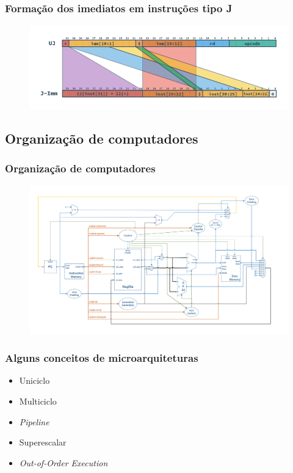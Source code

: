\documentclass[aspectratio=169]{beamer}
\begin{document}
    \begin{frame}
        \frametitle{Formação dos imediatos em instruções tipo \textbf{J}}
        \vfill
        \begin{figure}[H]
        \centering
            \includegraphics[width=.9\textwidth,height=.9\textheight,keepaspectratio]{../images/RV_J_Imm.png}
        \end{figure}
        \vfill
    \end{frame}

    \subsection{Organização de computadores}
    \begin{frame}
        \frametitle{Organização de computadores}
        \vfill
        \begin{figure}[H]
        \centering
            \includegraphics[width=.9\textwidth,height=.9\textheight,keepaspectratio]{../images/singlecycle_generic.png}
        \end{figure}
        \vfill
    \end{frame}

    \begin{frame}
        \frametitle{Alguns conceitos de microarquiteturas}
        \vfill
        \begin{itemize}
            \item Uniciclo
            \item Multiciclo
            \item \textit{Pipeline}
            \item Superescalar
            \item \textit{Out-of-Order Execution}
        \end{itemize}
        \vfill
    \end{frame}
\end{document}
